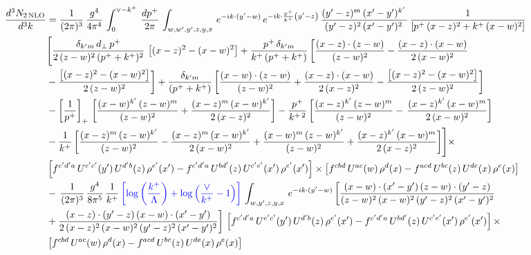 \documentclass[9pt]{article}
\numberwithin{equation}{section}
\begin{document}
\begin{align}
 \frac{d^{3}N_{2\,\rm NLO}}{d^{3}k} & = \frac{1}{(2\pi)^{3}}\,\frac{g^{4}}{4\pi^{4}}\,\int_{0}^{\vee-k^{+}}\, \frac{dp^{+}}{2\pi}\,\int_{w,w',y',z,y,x}\, e^{-ik\cdot (y'-w)}\,e^{-ik\cdot \frac{p^{+}}{k^{+}}\left(y'-z\right)}\, \frac{(y'-z)^{m}\,(x'-y')^{k'}\,}{(y'-z)^{2}\,(x'-y')^{2}\,}\, \frac{1}{\left[p^{+}\,(x-z)^{2}+k^{+}\,(x-w)^{2}\right]}\notag \\ & \Bigg[\frac{\delta_{k'm}\,d_{\perp}\,p^{+}}{2\,(z-w)^{2}\,(p^{+}+k^{+})^{2}}\, \left[(x-z)^{2}-(x-w)^{2}\right]+\frac{p^{+}\,\delta_{k'm}}{k^{+}\,(p^{+}+k^{+})}\,\bigg[\frac{(x-z)\cdot (z-w)}{(z-w)^{2}} -\frac{(x-z)\cdot (x-w)}{2\,(x-w)^{2}}\notag \\ & -\frac{\left[(x-z)^{2}-(x-w)^{2}\right]}{2\,(z-w)^{2}}\bigg] +\frac{\delta_{k'm}}{(p^{+}+k^{+})}\,\bigg[\frac{(x-w)\cdot (z-w)}{(z-w)^{2}}+\frac{(x-z)\cdot (x-w)}{2\,(x-z)^{2}} -\frac{\left[(x-z)^{2}-(x-w)^{2}\right]}{2\,(z-w)^{2}}\bigg]\notag \\ & -\left[\frac{1}{p^{+}}\right]_{+}\,\bigg[\frac{(x-w)^{k'}\,(z-w)^{m}}{(z-w)^{2}}+\frac{(x-z)^{m}\,(x-w)^{k'}}{2\,(x-z)^{2}}\bigg]-\frac{p^{+}}{k^{+\,2}}\,\bigg[\frac{(x-z)^{k'}\,(z-w)^{m}}{(z-w)^{2}} -\,\frac{(x-z)^{k'}\,(x-w)^{m}}{2\,(x-w)^{2}}\bigg]\notag \\ & -\frac{1}{k^{+}}\,\bigg[\frac{(x-z)^{m}\,(z-w)^{k'}}{(z-w)^{2}}-\frac{(x-z)^{m}\,(x-w)^{k'}}{2\,(x-w)^{2}}+\frac{(x-w)^{m}\,(z-w)^{k'}}{(z-w)^{2}} +\frac{(x-z)^{k'}\,(x-w)^{m}}{2\,(x-z)^{2}}\bigg]\Bigg]\times\,\notag \\ & \left[f^{c'd'a}\,U^{e'c'}(y')\,U^{d'b}(z)\,\rho^{e'}(x')-f^{c'd'a}\, 
    U^{bd'}(z)\,U^{c'e'}(x')\,\rho^{e'}(x')\right]\times \left[f^{cbd}\,U^{ac}(w)\,\rho^{d}(x) -f^{acd}\,U^{bc}(z)\,U^{de}(x)\,\rho^{e}(x)\right]\notag \\ &  -\, \frac{1}{(2\pi)^{3}}\,\frac{g^{4}}{8\pi^{5}}\,\frac{1}{k^{+}}\,{\color{blue}\left[\log{\left(\frac{k^{+}}{\Lambda}\right)}+\log{\left(\frac{\vee}{k^{+}}-1\right)}\right]}\,\int_{w,y',z,y,x}\, e^{-ik\cdot (y'-w)}\,\bigg[\frac{(x-w)\cdot (x'-y')\,(z-w)\cdot (y'-z)}{(z-w)^{2}\,(x-w)^{2}\,(y'-z)^{2}\,(x'-y')^{2}}\notag \\ & +\frac{(x-z)\cdot (y'-z)\,(x-w)\cdot (x'-y')}{2\,(x-z)^{2}\,(x-w)^{2}\,(y'-z)^{2}\,(x'-y')^{2}}\bigg]\, \left[f^{c'd'a}\,U^{e'c'}(y')\,U^{d'b}(z)\,\rho^{e'}(x')-f^{c'd'a}\, 
    U^{bd'}(z)\,U^{c'e'}(x')\,\rho^{e'}(x')\right]\times\notag \\ &  \left[f^{cbd}\,U^{ac}(w)\,\rho^{d}(x) -f^{acd}\,U^{bc}(z)\,U^{de}(x)\,\rho^{e}(x)\right] 
\end{align}
\end{document}
